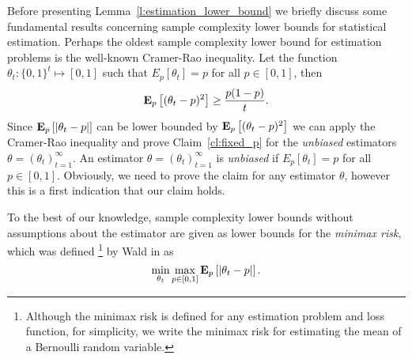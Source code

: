 Before presenting Lemma~\ref{l:estimation_lower_bound} we briefly discuss some
fundamental results concerning sample complexity lower bounds for statistical estimation.
Perhaps the oldest sample complexity lower bound for estimation problems
is the well-known Cramer-Rao inequality.
Let the function $\theta_t: \{0,1\}^t \mapsto [0,1]$ such that $E_p[\theta_t]=p$ for
all $p \in [0,1]$, then
\begin{equation}\label{eq:crlb}
  \bm{\mathrm{E}}_{p} \left[ (\theta_t - p)^2 \right] \geq \frac{p(1-p)}{t}.
\end{equation}
Since $\bm{\mathrm{E}}_{p} \left[ |\theta_t - p| \right]$ can be lower bounded
by $\bm{\mathrm{E}}_{p} \left[ (\theta_t - p)^2 \right]$ we can apply the Cramer-Rao inequality and
prove Claim~\ref{cl:fixed_p} for the \emph{unbiased} estimators
$\theta =(\theta_t)_{t=1}^\infty$. An estimator $\theta =(\theta_t)_{t=1}^\infty$
is \emph{unbiased} if $E_p[\theta_t]=p$ for all $p \in [0,1]$. Obviously, we need
to prove the claim for any estimator $\theta$, however this is a first indication
that our claim holds.


To the best of our knowledge, sample complexity lower bounds without
assumptions about the estimator are given as lower bounds for the
\emph{minimax risk}, which was defined
\footnote{
  Although the minimax risk is defined for any estimation problem and loss
  function, for simplicity, we write the minimax risk for estimating the mean
  of a Bernoulli random variable.}
by Wald in \cite{Wal39} as
\[
  \min_{\theta_t} \max_{p\in[0,1]} \bm{\mathrm{E}}_{p} \left[ |\theta_t - p| \right].
\]

